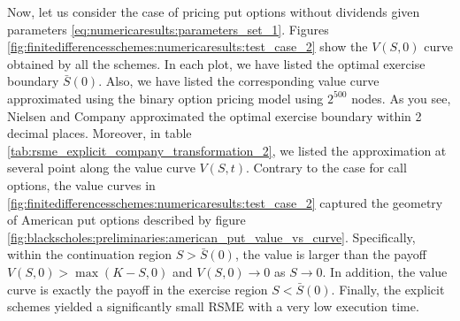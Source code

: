 Now, let us consider the case of pricing put options without dividends given parameters \eqref{eq:numericaresults:parameters_set_1}. Figures \eqref{fig:finitedifferencesschemes:numericaresults:test_case_2} show the $V(S, 0)$ curve obtained by all the schemes. In each plot, we have listed the optimal exercise boundary $\bar{S}(0)$. Also, we have listed the corresponding value curve approximated using the binary option pricing model using $2^{500}$ nodes. As you see, Nielsen and Company approximated the optimal exercise boundary within 2 decimal places. Moreover, in table \eqref{tab:rsme_explicit_company_transformation_2}, we listed the approximation at several point along the value curve $V(S,t)$. Contrary to the case for call options, the value curves in \eqref{fig:finitedifferencesschemes:numericaresults:test_case_2} captured the geometry of American put options described by figure \eqref{fig:blackscholes:preliminaries:american_put_value_vs_curve}. Specifically, within the continuation region $S>\bar{S}(0)$, the value is larger than the payoff $V(S,0)>\max(K-S,0)$ and $V(S,0)\rightarrow0$ as $S\rightarrow0$. In addition, the value curve is exactly the payoff in the exercise region $S<\bar{S}(0)$. Finally, the explicit schemes yielded a significantly small RSME with a very low execution time. 
